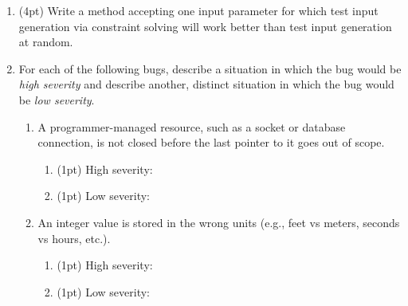\documentclass{report}
\newif\ifkey
\newcommand{\answerlong}[1]{\ifkey\color{red}\textbf{#1}\color{black}\else\vspace{0.5in}\fi\xspace}
\newcommand*{\pts}[1]{\addtocounter{points}{#1}(#1pt)}
\begin{document}
\begin{spacing}{1.4}
\begin{enumerate}[leftmargin=*]


  \item \pts{4}  Write a method accepting one input parameter for which test input generation
    via constraint solving will work better than test input generation at random.\\
    \answerlong{Answers vary. The key idea is to include a very specific test that only a single
      input can satisfy, such as \lstinline{if (x == 10): ...}.}

    \newpage

  \item For each of the following bugs, describe a situation in which the bug would be \emph{high severity}
    and describe another, distinct situation in which the bug would be \emph{low severity}.
    \begin{enumerate}
    \item A programmer-managed resource, such as a socket or database connection, is not closed before
      the last pointer to it goes out of scope.
      \begin{enumerate}
        \item \pts{1} High severity: \answerlong{A long-running program, such as a webserver, which may eventually run out of resources.}
        \item \pts{1} Low severity: \answerlong{a short-running program, such as one that sends a single ping and then exits: the resource will
          be freed when the program ends, anyway. Other examples are possible.}
      \end{enumerate}
    \item An integer value is stored in the wrong units (e.g., feet vs meters, seconds vs hours, etc.).
      \begin{enumerate}
      \item \pts{1} High severity: \answerlong{Mars polar orbiter crash.}
        \item \pts{1} Low severity: \answerlong{The integer value is part of a game
        and is only displayed to the user: e.g., it doesn't matter if an imaginary car's speed is in m/s or mph.
        Other answers are possible.}
          \end{enumerate}
      \end{enumerate}


\end{enumerate}
\end{spacing}
\end{document}
